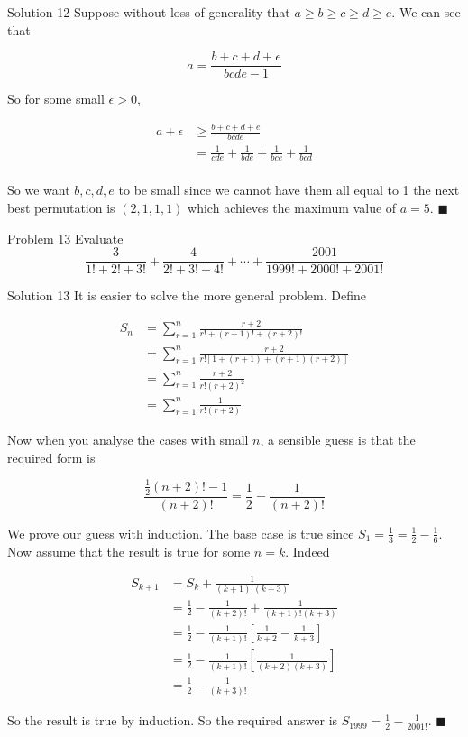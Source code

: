 \documentclass{article}
\begin{document}
\begin{solution}{Solution 12}
Suppose without loss of generality that $a\geq b\geq c \geq d \geq e$.
We can see that

$$
a = \frac{b+c+d+e}{bcde-1}
$$

So for some small $\epsilon > 0$,

\[
\begin{aligned}
a+\epsilon &\geq \frac{b+c+d+e}{bcde} \\
&= \frac{1}{cde} + \frac{1}{bde} + \frac{1}{bce} + \frac{1}{bcd} \\
\end{aligned}
\]

So we want $b,c,d,e$ to be small since we cannot have them all equal to
1 the next best permutation is $(2,1,1,1)$ which achieves the maximum value
of $a=5$. $\blacksquare$
\end{solution}

\vspace{0.2cm}

\begin{problem}{Problem 13}
Evaluate
\[
\frac{3}{1! + 2! + 3!} + \frac{4}{2! + 3! + 4!} + \cdots + \frac{2001}{1999! + 2000! + 2001!}
\]
\end{problem}

\begin{solution}{Solution 13}
It is easier to solve the more general problem. Define

\[
\begin{aligned}
S_n &= \sum_{r=1}^{n} \frac{r+2}{r! + (r+1)! + (r+2)!} \\
&= \sum_{r=1}^n \frac{r+2}{r! \left[ 1 + (r+1) + (r+1)(r+2) \right]} \\
&= \sum_{r=1}^n \frac{r+2}{r! (r+2)^2} \\
&= \sum_{r=1}^n \frac{1}{r! (r+2)}
\end{aligned}
\]

Now when you analyse the cases with small $n$, a sensible guess is that
the required form is

$$
\frac{\frac{1}{2} (n+2)! - 1}{(n+2)!} = \frac{1}{2} - \frac{1}{(n+2)!}
$$

We prove our guess with induction. The base case is true since
$S_1 = \frac{1}{3} = \frac{1}{2} - \frac{1}{6}$. Now assume that the result
is true for some $n=k$. Indeed

\[
\begin{aligned}
S_{k+1} &= S_k + \frac{1}{(k+1)!(k+3)} \\
&= \frac{1}{2} - \frac{1}{(k+2)!} + \frac{1}{(k+1)!(k+3)} \\
&= \frac{1}{2} - \frac{1}{(k+1)!} \left[ \frac{1}{k+2} - \frac{1}{k+3} \right] \\
&= \frac{1}{2} - \frac{1}{(k+1)!} \left[ \frac{1}{(k+2)(k+3)} \right] \\
&= \frac{1}{2} - \frac{1}{(k+3)!}
\end{aligned}
\]

So the result is true by induction. So the required answer is
$S_{1999} = \frac{1}{2} - \frac{1}{2001!}$. $\blacksquare$
\end{solution}
\end{document}
